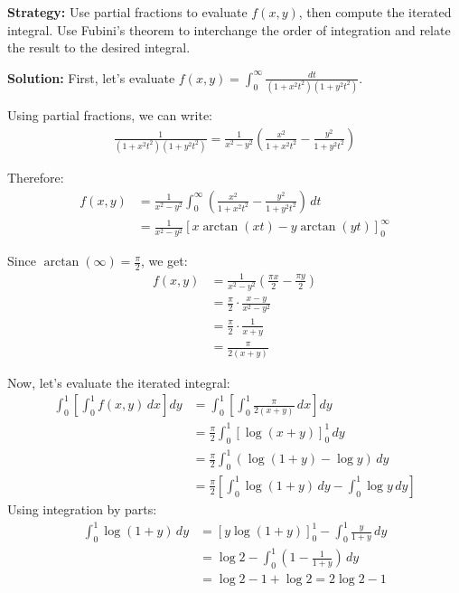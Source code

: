 \noindent\textbf{Strategy:} Use partial fractions to evaluate $f(x, y)$, then compute the iterated integral. Use Fubini's theorem to interchange the order of integration and relate the result to the desired integral.

\bigskip\noindent\textbf{Solution:}
First, let's evaluate $f(x, y) = \int_{0}^{\infty} \frac{dt}{(1 + x^{2}t^{2})(1 + y^{2}t^{2})}$.

Using partial fractions, we can write:
\begin{align*}
\frac{1}{(1 + x^{2}t^{2})(1 + y^{2}t^{2})} = \frac{1}{x^{2} - y^{2}} \left(\frac{x^{2}}{1 + x^{2}t^{2}} - \frac{y^{2}}{1 + y^{2}t^{2}}\right)
\end{align*}

Therefore:
\begin{align*}
f(x, y) &= \frac{1}{x^{2} - y^{2}} \int_{0}^{\infty} \left(\frac{x^{2}}{1 + x^{2}t^{2}} - \frac{y^{2}}{1 + y^{2}t^{2}}\right) \, dt \\
&= \frac{1}{x^{2} - y^{2}} \left[x \arctan(xt) - y \arctan(yt)\right]_{0}^{\infty}
\end{align*}

Since $\arctan(\infty) = \frac{\pi}{2}$, we get:
\begin{align*}
f(x, y) &= \frac{1}{x^{2} - y^{2}} \left(\frac{\pi x}{2} - \frac{\pi y}{2}\right) \\
&= \frac{\pi}{2} \cdot \frac{x - y}{x^{2} - y^{2}} \\
&= \frac{\pi}{2} \cdot \frac{1}{x + y} \\
&= \frac{\pi}{2(x + y)}
\end{align*}

Now, let's evaluate the iterated integral:
\begin{align*}
\int_{0}^{1} \left[ \int_{0}^{1} f(x, y) \, dx \right] dy &= \int_{0}^{1} \left[ \int_{0}^{1} \frac{\pi}{2(x + y)} \, dx \right] dy \\
&= \frac{\pi}{2} \int_{0}^{1} \left[ \log(x + y) \right]_{0}^{1} \, dy \\
&= \frac{\pi}{2} \int_{0}^{1} (\log(1 + y) - \log y) \, dy \\
&= \frac{\pi}{2} \left[ \int_{0}^{1} \log(1 + y) \, dy - \int_{0}^{1} \log y \, dy \right]
\end{align*}
Using integration by parts:
\begin{align*}
\int_{0}^{1} \log(1 + y) \, dy &= \left[y \log(1 + y)\right]_{0}^{1} - \int_{0}^{1} \frac{y}{1 + y} \, dy \\
&= \log 2 - \int_{0}^{1} \left(1 - \frac{1}{1 + y}\right) \, dy \\
&= \log 2 - 1 + \log 2 = 2 \log 2 - 1
\end{align*}

